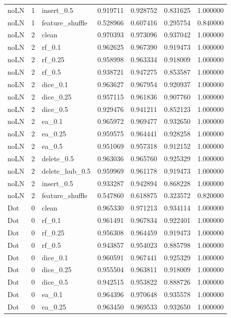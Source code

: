 \documentclass[UTF8,a4paper,11pt,fontset=fandol]{ctexart}
\begin{document}
{\begin{longtable}{lrlrrrr}
noLN & 1 & insert\_0.5 & 0.919711 & 0.928752 & 0.831625 & 1.000000 \\
noLN & 1 & feature\_shuffle & 0.528966 & 0.607416 & 0.295754 & 0.840000 \\
noLN & 2 & clean & 0.970393 & 0.973096 & 0.937042 & 1.000000 \\
noLN & 2 & rf\_0.1 & 0.962625 & 0.967390 & 0.919473 & 1.000000 \\
noLN & 2 & rf\_0.25 & 0.958998 & 0.963334 & 0.918009 & 1.000000 \\
noLN & 2 & rf\_0.5 & 0.938721 & 0.947275 & 0.853587 & 1.000000 \\
noLN & 2 & dice\_0.1 & 0.963627 & 0.967954 & 0.920937 & 1.000000 \\
noLN & 2 & dice\_0.25 & 0.957115 & 0.961836 & 0.907760 & 1.000000 \\
noLN & 2 & dice\_0.5 & 0.929476 & 0.941211 & 0.852123 & 1.000000 \\
noLN & 2 & ea\_0.1 & 0.965972 & 0.969477 & 0.932650 & 1.000000 \\
noLN & 2 & ea\_0.25 & 0.959575 & 0.964441 & 0.928258 & 1.000000 \\
noLN & 2 & ea\_0.5 & 0.951069 & 0.957318 & 0.912152 & 1.000000 \\
noLN & 2 & delete\_0.5 & 0.963036 & 0.965760 & 0.925329 & 1.000000 \\
noLN & 2 & delete\_hub\_0.5 & 0.959969 & 0.961178 & 0.919473 & 1.000000 \\
noLN & 2 & insert\_0.5 & 0.933287 & 0.942894 & 0.868228 & 1.000000 \\
noLN & 2 & feature\_shuffle & 0.547860 & 0.618875 & 0.323572 & 0.820000 \\
Dot & 0 & clean & 0.965330 & 0.971213 & 0.934114 & 1.000000 \\
Dot & 0 & rf\_0.1 & 0.961491 & 0.967834 & 0.922401 & 1.000000 \\
Dot & 0 & rf\_0.25 & 0.956308 & 0.964459 & 0.919473 & 1.000000 \\
Dot & 0 & rf\_0.5 & 0.943857 & 0.954023 & 0.885798 & 1.000000 \\
Dot & 0 & dice\_0.1 & 0.960591 & 0.967441 & 0.925329 & 1.000000 \\
Dot & 0 & dice\_0.25 & 0.955504 & 0.963811 & 0.918009 & 1.000000 \\
Dot & 0 & dice\_0.5 & 0.942515 & 0.953822 & 0.888726 & 1.000000 \\
Dot & 0 & ea\_0.1 & 0.964396 & 0.970648 & 0.935578 & 1.000000 \\
Dot & 0 & ea\_0.25 & 0.963450 & 0.969533 & 0.932650 & 1.000000 \\

\end{longtable}}
\end{document}
